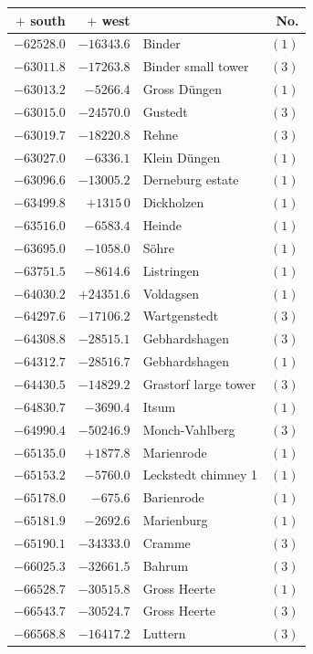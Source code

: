 \clearpage{}%
\begin{center}\begingroup\fontsize{8}{9}\selectfont
\setlength{\tabcolsep}{4pt}
\begin{tabular}{r|r|p{170pt}|r}\hline
\(+\) south&\(+\) west&&No.\\\hline
\(-62528.0\)&\(-16343.6\)&Binder&\((1)\)\\
\(-63011.8\)&\(-17263.8\)&Binder small tower&\((3)\)\\
\(-63013.2\)&\(-5266.4\)&Gross Düngen&\((1)\)\\
\(-63015.0\)&\(-24570.0\)&Gustedt&\((3)\)\\
\(-63019.7\)&\(-18220.8\)&Rehne&\((3)\)\\
\(-63027.0\)&\(-6336.1\)&Klein Düngen&\((1)\)\\
\(-63096.6\)&\(-13005.2\)&Derneburg estate&\((1)\)\\
\(-63499.8\)&\(+1315\,0\)&Dickholzen&\((1)\)\\
\(-63516.0\)&\(-6583.4\)&Heinde&\((1)\)\\
\(-63695.0\)&\(-1058.0\)&Söhre&\((1)\)\\
\(-63751.5\)&\(-8614.6\)&Listringen&\((1)\)\\
\(-64030.2\)&\(+24351.6\)&Voldagsen&\((1)\)\\
\(-64297.6\)&\(-17106.2\)&Wartgenstedt&\((3)\)\\
\(-64308.8\)&\(-28515.1\)&Gebhardshagen&\((3)\)\\
\(-64312.7\)&\(-28516.7\)&Gebhardshagen&\((1)\)\\
\(-64430.5\)&\(-14829.2\)&Grastorf large tower&\((3)\)\\
\(-64830.7\)&\(-3690.4\)&Itsum&\((1)\)\\
\(-64990.4\)&\(-50246.9\)&Monch-Vahlberg&\((3)\)\\
\(-65135.0\)&\(+1877.8\)&Marienrode&\((1)\)\\
\(-65153.2\)&\(-5760.0\)&Leckstedt chimney 1&\((1)\)\\
\(-65178.0\)&\(-675.6\)&Barienrode&\((1)\)\\
\(-65181.9\)&\(-2692.6\)&Marienburg&\((1)\)\\
\(-65190.1\)&\(-34333.0\)&Cramme&\((3)\)\\
\(-66025.3\)&\(-32661.5\)&Bahrum&\((3)\)\\
\(-66528.7\)&\(-30515.8\)&Gross Heerte&\((1)\)\\
\(-66543.7\)&\(-30524.7\)&Gross Heerte&\((3)\)\\
\(-66568.8\)&\(-16417.2\)&Luttern&\((3)\)\\

\end{tabular}
\end{center}
